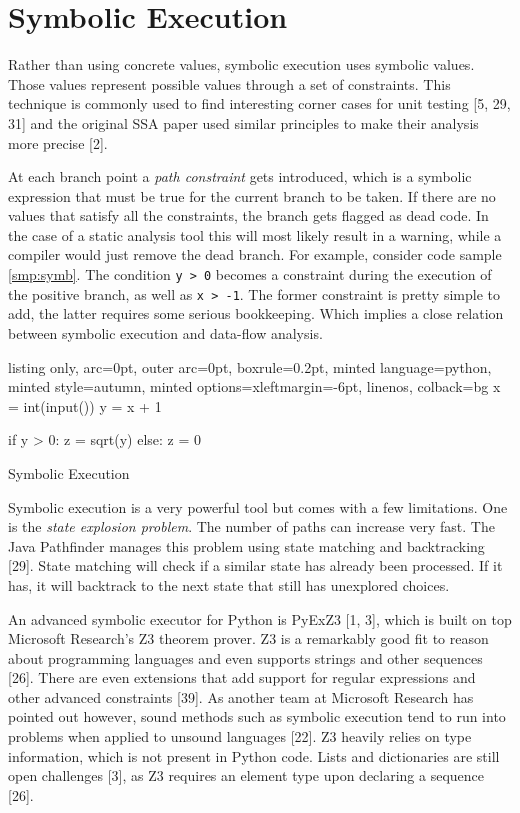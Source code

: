 \documentclass[a4paper, 16pt, oneside]{Thesis}
\begin{document}
\section{Symbolic Execution}\label{symbolic-execution}

Rather than using concrete values, symbolic execution uses symbolic
values. Those values represent possible values through a set of
constraints. This technique is commonly used to find interesting corner
cases for unit testing {[}5, 29, 31{]} and the original SSA paper used
similar principles to make their analysis more precise {[}2{]}.

At each branch point a \emph{path constraint} gets introduced, which is
a symbolic expression that must be true for the current branch to be
taken. If there are no values that satisfy all the constraints, the
branch gets flagged as dead code. In the case of a static analysis tool
this will most likely result in a warning, while a compiler would just
remove the dead branch. For example, consider code sample
\ref{smp:symb}. The condition \texttt{y\ \textgreater{}\ 0} becomes a
constraint during the execution of the positive branch, as well as
\texttt{x\ \textgreater{}\ -1}. The former constraint is pretty simple
to add, the latter requires some serious bookkeeping. Which implies a
close relation between symbolic execution and data-flow analysis.

\begin{code}
  \begin{tcblisting}{listing only, 
  arc=0pt,
  outer arc=0pt, 
  boxrule=0.2pt,
  minted language=python,
  minted style=autumn,
  minted options={xleftmargin=-6pt, linenos},
  colback=bg }
x = int(input())
y = x + 1

if y > 0:
    z = sqrt(y)
else:
    z = 0
\end{tcblisting}
\caption{Symbolic Execution} \label{smp:symb}
\end{code}

\vspace{-2pt}

Symbolic execution is a very powerful tool but comes with a few
limitations. One is the \emph{state explosion problem}. The number of
paths can increase very fast. The Java Pathfinder manages this problem
using state matching and backtracking {[}29{]}. State matching will
check if a similar state has already been processed. If it has, it will
backtrack to the next state that still has unexplored choices.

An advanced symbolic executor for Python is PyExZ3 {[}1, 3{]}, which is
built on top Microsoft Research's Z3 theorem prover. Z3 is a remarkably
good fit to reason about programming languages and even supports strings
and other sequences {[}26{]}. There are even extensions that add support
for regular expressions and other advanced constraints {[}39{]}. As
another team at Microsoft Research has pointed out however, sound
methods such as symbolic execution tend to run into problems when
applied to unsound languages {[}22{]}. Z3 heavily relies on type
information, which is not present in Python code. Lists and dictionaries
are still open challenges {[}3{]}, as Z3 requires an element type upon
declaring a sequence {[}26{]}.
\end{document}
